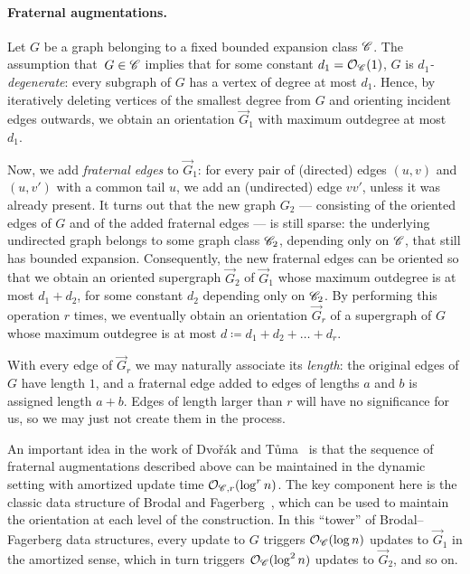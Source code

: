 

\paragraph*{Fraternal augmentations.}
Let $G$ be a graph belonging to a fixed bounded expansion class $\mathscr C$. The assumption that~$G\in \mathscr C$ implies that for some constant $d_1=\mathcal{O}_\mathscr C(1)$, $G$ is \emph{$d_1$-degenerate}: every subgraph of $G$ has a vertex of degree at most $d_1$. Hence, by iteratively deleting vertices of the smallest degree from $G$ and orienting incident edges outwards, we obtain an orientation $\vec G_1$ with maximum outdegree at most~$d_1$.

Now, we add \emph{fraternal edges} to $\vec G_1$: for every pair of (directed) edges $(u,v)$ and $(u,v')$ with a common tail $u$, we add an (undirected) edge $vv'$, unless it was already present. It turns out that the new graph $G_2$ --- consisting of the oriented edges of $G$ and of the added fraternal edges --- is still sparse: the underlying undirected graph belongs to some graph class $\mathscr C_2$, depending only on $\mathscr C$, that still has bounded expansion. Consequently, the new fraternal edges can be oriented so that we obtain an oriented supergraph $\vec G_2$ of $\vec G_1$ whose maximum outdegree is at most $d_1+d_2$, for some constant $d_2$ depending only on $\mathscr C_2$. By performing this operation $r$ times, we eventually obtain an orientation $\vec G_r$ of a supergraph of $G$ whose maximum outdegree is at most $d\coloneqq d_1+d_2+\ldots+d_r$. 

With every edge of $\vec G_r$ we may naturally associate its \emph{length}: the original edges of $G$ have length $1$, and a fraternal edge added to edges of lengths $a$ and $b$ is assigned length $a+b$. Edges of length larger than $r$ will have no significance for us, so we may just not create them in the process.

An important idea in the work of Dvo\v{r}\'ak and T\r{u}ma~\cite{DvorakT13} is that the sequence of fraternal augmentations described above can be maintained in the dynamic setting with amortized update time $\mathcal{O}_{\mathscr C,r}(\log^r n)$. The key component here is the classic data structure of Brodal and Fagerberg~\cite{BrodalF99}, which can be used to maintain the orientation at each level of the construction. In this ``tower'' of Brodal--Fagerberg data structures, every update to $G$ triggers $\mathcal{O}_{\mathscr C}(\log n)$ updates to $\vec G_1$ in the amortized sense, which in turn triggers $\mathcal{O}_{\mathscr C}(\log^2 n)$ updates to $\vec G_2$, and so on. 

